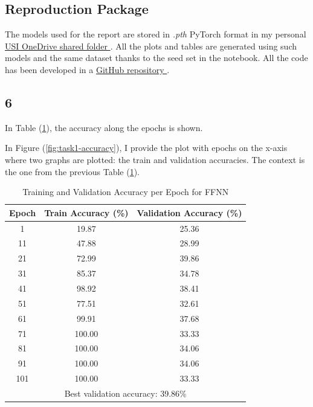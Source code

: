 \documentclass[11pt]{scrartcl}
\begin{document}
\subsection*{Reproduction Package}

The models used for the report are stored in \textit{.pth} PyTorch format
in my personal 
\href{https://usi365-my.sharepoint.com/:f:/g/personal/moralj_usi_ch/EjFmZ00gxlVNtqGCawGJx9sBzvia6ry5RqAWAV4rOLi3CA?e=rTWhEa}{
	USI OneDrive shared folder
}.
All the plots and tables are generated using such models 
and the same dataset thanks to the seed set in the notebook.
All the code has been developed in a 
\href{https://github.com/JekxDevil/artificial-intelligence/tree/main/courses/usi/machine-learning/assignments/2}{
	GitHub repository
}.


\subsection*{6}

In Table (\ref{tab:task1-accuracy}),
the accuracy along the epochs is shown.

In Figure (\ref{fig:task1-accuracy}), 
I provide the plot with epochs on the x-axis where two graphs are plotted:
the train and validation accuracies.
The context is the one from the previous Table (\ref{tab:task1-accuracy}). 


\begin{table}[htbp]
\centering
\caption{Training and Validation Accuracy per Epoch for FFNN}
\begin{tabular}{ccc}
\toprule
\textbf{Epoch} & \textbf{Train Accuracy (\%)} & \textbf{Validation Accuracy (\%)} \\
\midrule
1    & 19.87  & 25.36  \\
11   & 47.88  & 28.99  \\
21   & 72.99  & 39.86  \\
31   & 85.37  & 34.78  \\
41   & 98.92  & 38.41  \\
51   & 77.51  & 32.61  \\
61   & 99.91  & 37.68  \\
71   & 100.00 & 33.33  \\
81   & 100.00 & 34.06  \\
91   & 100.00 & 34.06  \\
101  & 100.00 & 33.33  \\
\midrule
\multicolumn{3}{c}{Best validation accuracy: 39.86\%} \\
\bottomrule
\end{tabular}
\label{tab:task1-accuracy}
\end{table}
\end{document}
